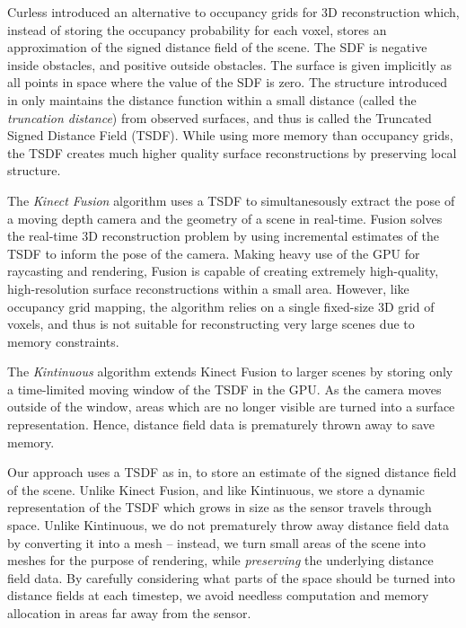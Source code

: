 \documentclass[10pt,twocolumn,letterpaper]{article}
\begin{document}
Curless \cite{Curless1996} introduced an alternative to occupancy grids for 3D
reconstruction which, instead of storing the occupancy probability for each
voxel, stores an approximation of the signed distance field of the scene.  The
SDF is negative inside obstacles, and positive outside obstacles. The surface
is given implicitly as all points in space where the value of the SDF is zero.
The structure introduced in \cite{Curless1996} only maintains the distance
function within a small distance (called the \emph{truncation distance}) from
observed surfaces, and thus is called the Truncated Signed Distance Field
(TSDF).  While using more memory than occupancy grids, the TSDF creates much
higher quality surface reconstructions by preserving local structure.

The \emph{Kinect Fusion} \cite{Newcombe} algorithm uses a TSDF to
simultanesously extract the pose of a moving depth camera and the geometry of a
scene in real-time. Fusion solves the real-time 3D reconstruction problem
by using incremental estimates of the TSDF to inform the pose of the camera.
Making heavy use of the GPU for raycasting and rendering, Fusion is
capable of creating extremely high-quality, high-resolution surface 
reconstructions within a small area. However, like occupancy grid mapping, the
algorithm relies on a single fixed-size 3D grid of voxels, and thus is not
suitable for reconstructing very large scenes due to memory constraints.

The \emph{Kintinuous} \cite{Whelan2013} algorithm extends Kinect Fusion to
larger scenes by storing only a time-limited moving window of the TSDF in the
GPU. As the camera moves outside of the window, areas which are no longer
visible are turned into a surface representation. Hence, distance field data is
prematurely thrown away to save memory.

Our approach uses a TSDF as in\cite{Curless1996,Newcombe,Whelan2013,Bylow2013},
to store an estimate of the signed distance field of the scene. Unlike Kinect
Fusion, and like Kintinuous, we store a dynamic representation of the TSDF
which grows in size as the sensor travels through space. Unlike Kintinuous, we
do not prematurely throw away distance field data by converting it into a
mesh -- instead, we turn small areas of the scene into meshes for the purpose
of rendering, while \textit{preserving} the underlying distance field data. By
carefully considering what parts of the space should be turned into distance
fields at each timestep, we avoid needless computation and memory allocation in
areas far away from the sensor. 
\end{document}
